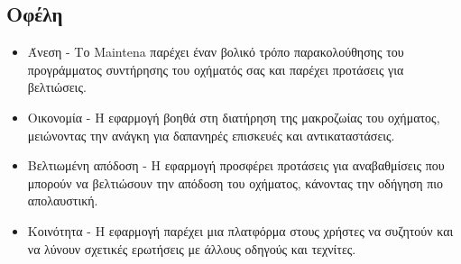 \documentclass[11pt]{scrartcl} %
\begin{document}
\subsection*{Οφέλη}
    \begin{itemize}
        \item Άνεση - Το Maintena παρέχει έναν βολικό τρόπο παρακολούθησης του προγράμματος συντήρησης του οχήματός σας και παρέχει προτάσεις για βελτιώσεις.
        \item Οικονομία - Η εφαρμογή βοηθά στη διατήρηση της μακροζωίας του οχήματος, μειώνοντας την ανάγκη για δαπανηρές επισκευές και αντικαταστάσεις.
        \item Βελτιωμένη απόδοση - Η εφαρμογή προσφέρει προτάσεις για αναβαθμίσεις που μπορούν να βελτιώσουν την απόδοση του οχήματος, κάνοντας την οδήγηση πιο απολαυστική.
        \item Κοινότητα - Η εφαρμογή παρέχει μια πλατφόρμα στους χρήστες να συζητούν και να λύνουν σχετικές ερωτήσεις με άλλους οδηγούς και τεχνίτες.
    \end{itemize}

% 
\end{document}
